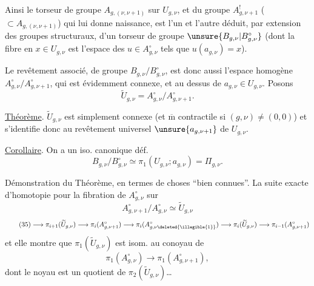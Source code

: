 Ainsi le torseur  de groupe $A_{g,(\nu,\nu+1)}$  sur  $U_{g,\nu}$, et  du groupe $A_{g,\nu+1}^{!}$ ($\subset A_{g,(\nu,\nu+1)}$) qui lui donne naissance, est l'un et l'autre déduit, par extension des groupes structuraux, d'un torseur de groupe $\unsure{B_{g,\nu}|B_{g,\nu}^{\circ}}$ (dont la fibre en $x\in U_{g,\nu}$ est l'espace des  $u\in A_{g,\nu}^{\circ}$ tels que $u(a_{g,\nu})=x$).

Le revêtement  associé, de groupe $B_{g,\nu}/B_{g,\nu}^{\circ}$, est donc aussi l'espace homogène $A_{g,\nu}^{\circ}/A_{g,\nu+1}^{\circ}$, qui est évidemment connexe, et  au dessus de $a_{g,\nu}\in U_{g,\nu}$. Posons
\[
\tag{33}
\widetilde U_{g,\nu}=A_{g,\nu}^{\circ}/A_{g,\nu+1}^{\circ}.
\]

\uline{Théorème}. $\widetilde U_{g,\nu}$ est simplement connexe  (et $\overline{\mathrm m}$ contractile si $(g,\nu)\ne(0,0)$) et s'identifie donc au revêtement universel   $\unsure{a_{g,\nu+1}}$ de $U_{g,\nu}$.


\uline{Corollaire}. On a un iso. canonique déf.
\[
\tag{34}
B_{g,\nu}/B_{g,\nu}^{\circ}\simeq\pi_1(U_{g,\nu};a_{g,\nu})=\Pi_{g,\nu}.
\]

Démonstration du Théorème, en termes de choses ``bien connues''. La  suite exacte d'homotopie pour la fibration de $A_{g,\nu}^{\circ}$ sur
\[
A_{g,\nu+1}^{\circ}/A_{g,\nu}^{\circ}\simeq\widetilde U_{g,\nu}
\]
\[
\tag{35}
\longrightarrow\pi_{i+1}(\widetilde U_{g,\nu})
\longrightarrow\pi_i(A_{g,\nu+1}^{\circ})
\longrightarrow\pi_i(A_{g,\nu\deleted{\illegible{1}}}^{\circ})
\longrightarrow\pi_i(\widetilde U_{g,\nu})
\longrightarrow\pi_{i-1}(A_{g,\nu+1}^{\circ})
\]
et elle montre que $\pi_1(\widetilde U_{g,\nu})$ est isom. au conoyau de
\[
\pi_1(A_{g,\nu}^{\circ})\longrightarrow\pi_1(A_{g,\nu+1}^{\circ}),
\]
dont le noyau est un quotient de $\pi_2(\widetilde U_{g,\nu})$\ldots

